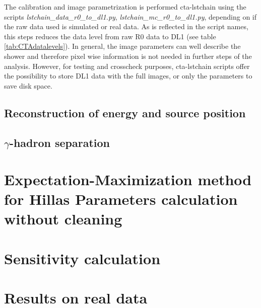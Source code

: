 \documentclass[main.tex]{subfiles}
\begin{document}
The calibration and image parametrization is performed \gls{cta-lstchain} using the scripts \textit{lstchain_data_r0_to_dl1.py}, \textit{lstchain_mc_r0_to_dl1.py}, depending on if the raw data used is simulated or real data. As is reflected in the script names, this steps reduces the data level from raw R0 data to DL1 (see table \ref{tab:CTAdatalevels}). In general, the image parameters can well describe the shower and therefore pixel wise information is not needed in further steps of the analysis. However, for testing and crosscheck purposes, \gls{cta-lstchain} scripts offer the possibility to store DL1 data with the full images, or only the parameters to save disk space.


\subsection{Reconstruction of energy and source position}



\subsection{$\gamma$-hadron separation}

\section[Expectation-Maximization method for Hillas Parameters...]{Expectation-Maximization method for Hillas Parameters calculation without cleaning} \label{sec:EM}
\section{Sensitivity calculation}
\section{Results on real data}
\end{document}
